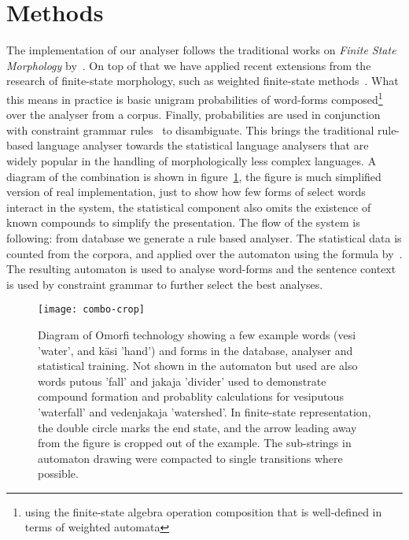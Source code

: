 \documentclass[preprint]{flammie}
\begin{document}
\section{Methods}
\label{sec:methods}

The implementation of our analyser follows the traditional works on
\textit{Finite State Morphology} by~\citet{beesley2003finite}. On top of
that we have applied recent extensions from the research of finite-state
morphology, such as weighted finite-state methods~\citep{openfst,hfst2012}.
What this means in practice is basic unigram probabilities of word-forms
composed\footnote{using the finite-state algebra operation composition that
is well-defined in terms of weighted automata} over the analyser from a
corpus.  Finally, probabilities are used in conjunction with constraint
grammar rules~\cite{karlsson1995constraint} to disambiguate.  This brings
the traditional rule-based language analyser towards the statistical
language analysers that are widely popular in the handling of
morphologically less complex languages.  A diagram of the combination is
shown in figure~\ref{fig:combo}, the figure is much simplified version of
real implementation, just to show how few forms of select words interact in
the system, the statistical component also omits the existence of known
compounds to simplify the presentation. The flow of the system is following:
from database we generate a rule based analyser. The statistical data is
counted from the corpora, and applied over the automaton using the formula
by~\cite{pirinen2009weighted}. The resulting automaton is used to analyse
word-forms and the sentence context is used by constraint grammar to further
select the best analyses.

\begin{figure}[tb!]
    \texttt{[image: combo-crop]}
    \caption{Diagram of Omorfi technology showing a few example words (vesi
    'water', and käsi 'hand') and forms in the database, analyser and
statistical training. Not shown in the automaton but used are also words
putous 'fall' and jakaja 'divider' used to demonstrate compound formation
and probablity calculations for vesiputous 'waterfall' and vedenjakaja
'watershed'. In finite-state representation, the double circle marks the end
state, and the arrow leading away from the figure is cropped out of the
example. The sub-strings in automaton drawing were compacted to single
transitions where possible. \label{fig:combo}}
\end{figure}
\end{document}
